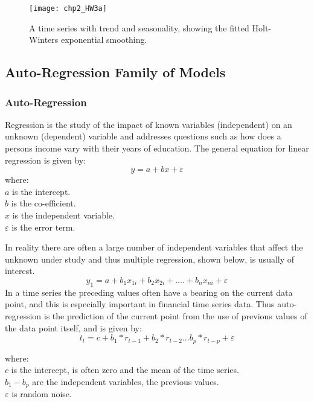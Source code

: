 \begin{figure}[tbph!]
\centering
\texttt{[image: chp2\_HW3a]}
\caption[Fitted time series with trend and seasonality]{A time series with trend and seasonality, showing the fitted Holt-Winters exponential smoothing.}
\label{fig:HW3a}
\end{figure}



\subsection{Auto-Regression Family of Models}

\subsubsection{Auto-Regression}
\label{sec:autoregression}
Regression is the study of the impact of known variables (independent) on an unknown (dependent) variable and addresses questions such as how does a persons income vary with their years of education. The general equation for linear regression is given by:
\[ y = a + bx + \varepsilon \]
where:\\
$ a $ is the intercept.\\
$ b $ is the co-efficient.\\
$ x $ is the independent variable.\\
$ \varepsilon $ is the error term.

In reality there are often a large number of independent variables that affect the unknown under study and thus multiple regression, shown below, is usually of interest.
\[ y_{1} = a + b_{1}x_{1i} + b_{2}x_{2i} +  ....   +b_{n}x_{ni} + \varepsilon\]
In a time series the preceding values often have a bearing on the current data point, and this is especially important in financial time series data. Thus auto-regression is the prediction of the current point from the use of previous values of the data point itself, and is given by:
\[ t_{t}=c+b_{1}*r_{t-1}+b_{2}*r_{t-2}...b_{p}*r_{t-p}+ \varepsilon \]

where:\\
$ c $ is the intercept, is often zero and the mean of the time series. \\
$ b_{1}-b_{p} $ are the independent variables, the previous values.\\
$ \varepsilon $ is random noise. 

